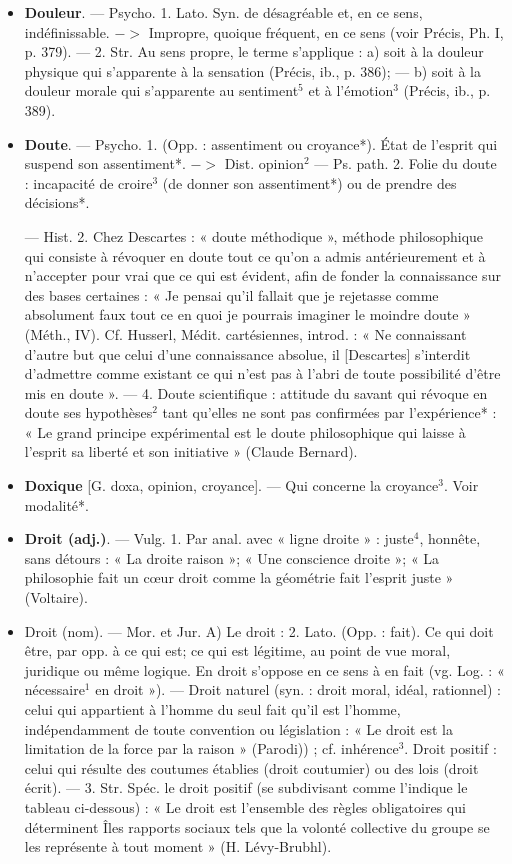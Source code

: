 \begin{itemize}[leftmargin=1cm, label=, itemsep=1pt]
\item {\bf Douleur}. — Psycho. 1. Lato. Syn. de
désagréable et, en ce sens, indéfinissable. $->$ Impropre, quoique fréquent, en ce sens (voir Précis, Ph. I,
p. 379). — 2. Str. Au sens propre,
le terme s’applique : a) soit à la douleur physique qui s'apparente à la
sensation (Précis, ib., p. 386); —
b) soit à la douleur morale qui s’apparente au sentiment$^5$ et à l’émotion$^3$
(Précis, ib., p. 389).

\item {\bf Doute}. — Psycho. 1. (Opp. :
assentiment ou croyance*). État de l'esprit
qui suspend son assentiment*.
$->$ Dist. opinion$^2$ — Ps. path.
2. Folie du doute : incapacité de
croire$^3$ (de donner son assentiment*)
ou de prendre des décisions*.

— Hist. 2. Chez Descartes : « doute
méthodique », méthode philosophique qui consiste à révoquer en
doute tout ce qu’on a admis antérieurement et à n’accepter pour vrai
que ce qui est évident, afin de fonder
la connaissance sur des bases certaines : « Je pensai qu'il fallait que
je rejetasse comme absolument faux
tout ce en quoi je pourrais imaginer
le moindre doute » (Méth., IV). Cf.
Husserl, Médit. cartésiennes, introd. :
« Ne connaissant d’autre but que
celui d’une connaissance absolue,
il [Descartes] s’interdit d'admettre
comme existant ce qui n’est pas à
l’abri de toute possibilité d’être mis
en doute ». — 4. Doute scientifique :
attitude du savant qui révoque en
doute ses hypothèses$^2$ tant qu’elles
ne sont pas confirmées par l’expérience* : « Le grand principe expérimental est le doute philosophique
qui laisse à l’esprit sa liberté et son
initiative » (Claude Bernard).

\item {\bf Doxique} [G. doxa, opinion, croyance].
— Qui concerne la croyance$^3$. Voir
modalité*.

\item {\bf Droit (adj.)}. — Vulg. 1. Par anal. avec
« ligne droite » : juste$^4$, honnête, sans
détours : « La droite raison »; « Une
conscience droite »; « La philosophie
fait un cœur droit comme la géométrie fait l'esprit juste » (Voltaire).

\item {\bf }Droit (nom). — Mor. et Jur. A) Le
droit : 2. Lato. (Opp. : fait). Ce qui
doit être, par opp. à ce qui est; ce
qui est légitime, au point de vue
moral, juridique ou même logique.
En droit s’oppose en ce sens à en fait
(vg. Log. : « nécessaire$^1$ en droit »).
— Droit naturel (syn. : droit moral,
idéal, rationnel) : celui qui appartient
à l’homme du seul fait qu'il est
l’homme, indépendamment de toute
convention ou législation : « Le droit
est la limitation de la force par la
raison » (Parodi)) ; cf. inhérence$^3$. Droit
positif : celui qui résulte des coutumes établies (droit coutumier) ou
des lois (droit écrit). — 3. Str. Spéc.
le droit positif (se subdivisant comme
l'indique le tableau ci-dessous) :
« Le droit est l’ensemble des règles
obligatoires qui déterminent Îles
rapports sociaux tels que la volonté
collective du groupe se les représente
à tout moment » (H. Lévy-Brubhl).


\end{itemize}
